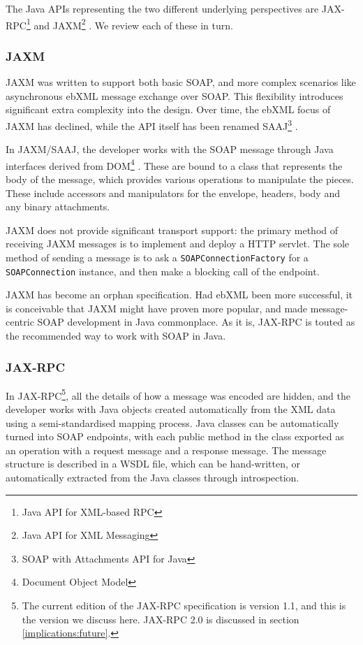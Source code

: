 The Java APIs representing the two different underlying perspectives
are JAX-RPC\footnote{Java API for XML-based RPC}
\cite{spec:JAX-RPC-11} and JAXM\footnote{Java API for XML Messaging}
\cite{spec:JAX-M-11}. We review each of these in turn.

\subsubsection{JAXM}
\label{intro:jaxm}

JAXM was written to support both basic SOAP, and more complex
scenarios like asynchronous ebXML message exchange over SOAP. This
flexibility introduces significant extra complexity into the design.
Over time, the ebXML focus of JAXM has declined, while the API itself
has been renamed SAAJ\footnote{SOAP with Attachments API for Java}
\cite{spec:SAAJ-12}.

In JAXM/SAAJ, the developer works with the SOAP message through Java
interfaces derived from DOM\footnote{Document Object Model}
\cite{spec:DOM}. These are bound to a class that represents the body
of the message, which provides various operations to manipulate the
pieces. These include accessors and manipulators for the envelope,
headers, body and any binary attachments.

JAXM does not provide significant transport support: the primary
method of receiving JAXM messages is to implement and deploy a HTTP
servlet.  The sole method of sending a message is to ask a
{\tt SOAPConnectionFactory} for a {\tt SOAPConnection} instance, and
then make a blocking call of the endpoint.

JAXM has become an orphan specification. Had ebXML been more
successful, it is conceivable that JAXM might have proven more
popular, and made message-centric SOAP development in Java
commonplace. As it is, JAX-RPC is touted as the recommended way to
work with SOAP in Java.

\subsubsection{JAX-RPC}
\label{intro:jax-rpc}

In JAX-RPC\footnote{The current edition of the JAX-RPC specification
is version 1.1, and this is the version we discuss here. JAX-RPC 2.0
is discussed in section \ref{implications:future}.}, all the details of
how a message was encoded are hidden, and the developer works with
Java objects created automatically from the XML data using a
semi-standardised mapping process. Java classes can be automatically
turned into SOAP endpoints, with each public method in the class
exported as an operation with a request message and a response
message. The message structure is described in a WSDL file, which can
be hand-written, or automatically extracted from the Java classes
through introspection.

